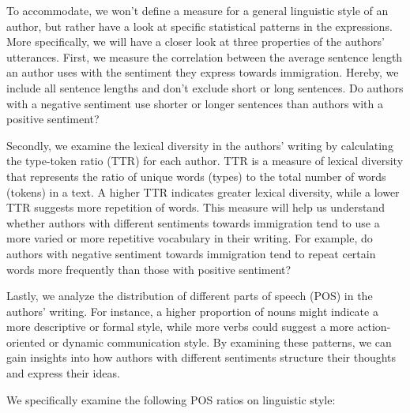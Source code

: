 \documentclass[11pt]{article}
\begin{document}
To accommodate, we won't define a measure for a general linguistic style of an author, but rather have a look at specific statistical patterns in the expressions.
More specifically, we will have a closer look at three properties of the authors' utterances.
First, we measure the correlation between the average sentence length an author uses with the sentiment they express towards immigration.
Hereby, we include all sentence lengths and don't exclude short or long sentences.
Do authors with a negative sentiment use shorter or longer sentences than authors with a positive sentiment?

Secondly, we examine the lexical diversity in the authors' writing by calculating the type-token ratio (TTR) for each author.
TTR is a measure of lexical diversity that represents the ratio of unique words (types) to the total number of words (tokens) in a text.
A higher TTR indicates greater lexical diversity, while a lower TTR suggests more repetition of words.
This measure will help us understand whether authors with different sentiments towards immigration tend to use a more varied or more repetitive vocabulary in their writing.
For example, do authors with negative sentiment towards immigration tend to repeat certain words more frequently than those with positive sentiment?

Lastly, we analyze the distribution of different parts of speech (POS) in the authors' writing.
For instance, a higher proportion of nouns might indicate a more descriptive or formal style, while more verbs could suggest a more action-oriented or dynamic communication style.
By examining these patterns, we can gain insights into how authors with different sentiments structure their thoughts and express their ideas.

We specifically examine the following POS ratios on linguistic style:
\end{document}
